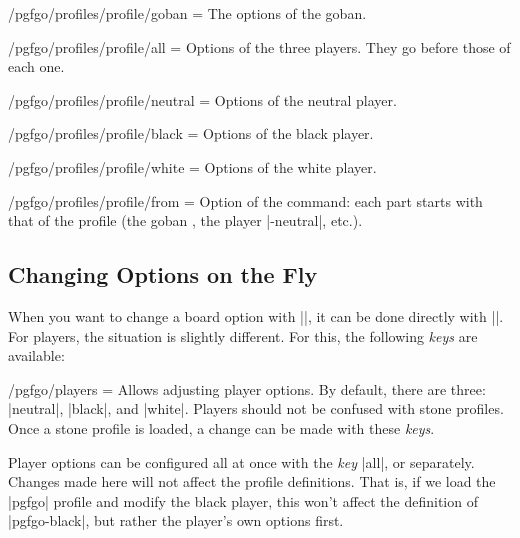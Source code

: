 \begin{goban}[9, stone = {radius = 4pt}, mark = {line = {color = red}}]
\begin{command}{\pgfgodefineprofile{}}
	\begin{key}{/pgfgo/profiles/profile/goban = }
		The options of the goban.
	\end{key}

	\begin{key}{/pgfgo/profiles/profile/all = }
		Options of the three players. They go before those of each one.
	\end{key}

	\begin{key}{/pgfgo/profiles/profile/neutral = }
		Options of the neutral player.
	\end{key}

	\begin{key}{/pgfgo/profiles/profile/black = }
		Options of the black player.
	\end{key}

	\begin{key}{/pgfgo/profiles/profile/white = }
		Options of the white player.
	\end{key}

	\begin{key}{/pgfgo/profiles/profile/from = }
		Option of the command: each part starts with that of the profile  (the goban , the player |-neutral|, etc.).
	\end{key}
\end{command}

\subsection{Changing Options on the Fly}

When you want to change a board option with |\pgfgoset|, it can be done directly with ||. For players, the situation is slightly different. For this, the following \emph{keys} are available:

\begin{key}{/pgfgo/players = }
	Allows adjusting player options. By default, there are three: |neutral|, |black|, and |white|. Players should not be confused with stone profiles. Once a stone profile is loaded, a change can be made with these \emph{keys}.
\end{key}

Player options can be configured all at once with the \emph{key} |all|, or separately. Changes made here will not affect the profile definitions. That is, if we load the |pgfgo| profile and modify the black player, this won’t affect the definition of |pgfgo-black|, but rather the player’s own options first.


\end{goban}
